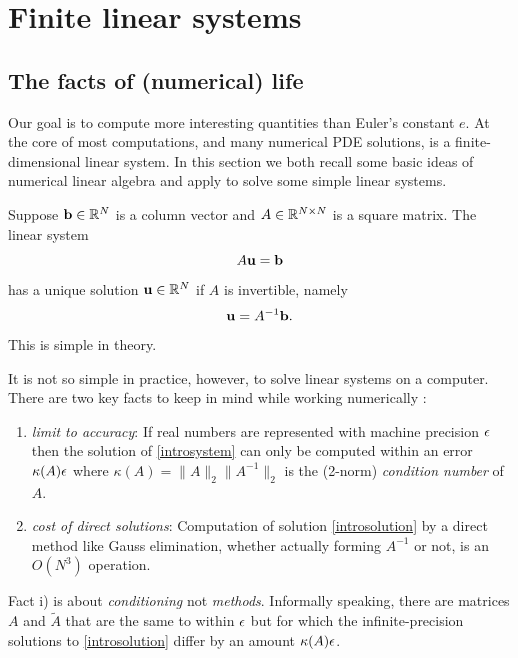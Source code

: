 
\chapter{Finite linear systems}
\label{chap:linearsystem}

\section{The facts of (numerical) life}

Our goal is to compute more interesting quantities than Euler's constant $e$.  At the core of most \PETSc computations, and many numerical PDE solutions, is a finite-dimensional linear system.  In this section we both recall some basic ideas of numerical linear algebra and apply \PETSc to solve some simple linear systems.

Suppose $\mathbf{b}\in \mathbb{R}^{N}$ is a column vector and $A\in\mathbb{R}^{N\times N}$ is a square matrix.  The linear system
\begin{equation}
A \mathbf{u} = \mathbf{b} \label{introsystem}
\end{equation}
has a unique solution $\mathbf{u}\in \mathbb{R}^{N}$ if $A$ is invertible, namely
\begin{equation}
\mathbf{u} = A^{-1} \mathbf{b}. \label{introsolution}
\end{equation}
This is simple in theory.

It is not so simple in practice, however, to solve linear systems on a computer.  There are two key facts to keep in mind while working numerically  \citep{TrefethenBau}:
\renewcommand{\labelenumi}{\roman{enumi})}
\begin{enumerate}
\item \label{limittoaccuracy} \emph{limit to accuracy}:  If real numbers are represented with machine precision $\epsilon$ then the solution of \eqref{introsystem} can only be computed within an error $\kappa(A) \epsilon$ where $\kappa(A) = \|A\|_2 \|A^{-1}\|_2$ is the (2-norm) \emph{condition number} of $A$.
\item \emph{cost of direct solutions}:  Computation of solution \eqref{introsolution} by a direct method like Gauss elimination, whether actually forming $A^{-1}$ or not, is an $O(N^3)$ operation.
\end{enumerate}

Fact i) is about \emph{conditioning} not \emph{methods}.  Informally speaking, there are matrices $A$ and $\tilde A$ that are the same to within $\epsilon$ but for which the infinite-precision solutions to \eqref{introsolution} differ by an amount $\kappa(A) \epsilon$.

